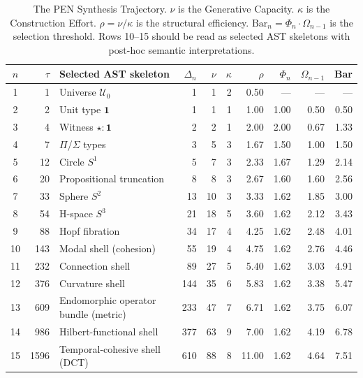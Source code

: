 \documentclass[11pt,a4paper]{article}
\theoremstyle{plain}
\theoremstyle{definition}
\theoremstyle{remark}
\newcommand{\U}{\mathcal{U}}
\begin{document}
\begin{table}[tbp]
\centering
\caption{The PEN Synthesis Trajectory.  $\nu$ is the Generative Capacity.  $\kappa$ is the Construction Effort.  $\rho = \nu/\kappa$ is the structural efficiency.  $\mathrm{Bar}_n = \Phi_n \cdot \Omega_{n-1}$ is the selection threshold.  Rows 10--15 should be read as selected AST skeletons with post-hoc semantic interpretations.}
\label{tab:genesis}
\small
\setlength{\tabcolsep}{3pt}
\begin{tabular}{@{}cr l rrrr rrr@{}}
\toprule
$n$ & $\tau$ & Selected AST skeleton & $\Delta_n$ & $\nu$ & $\kappa$ & $\rho$ & $\Phi_n$ & $\Omega_{n-1}$ & Bar \\
\midrule
1  & 1    & Universe $\U_0$              & 1   & 1   & 2 & 0.50  & ---  & ---  & ---  \\
2  & 2    & Unit type $\mathbf{1}$       & 1   & 1   & 1 & 1.00  & 1.00 & 0.50 & 0.50 \\
3  & 4    & Witness $\star : \mathbf{1}$ & 2   & 2   & 1 & 2.00  & 2.00 & 0.67 & 1.33 \\
4  & 7    & $\Pi$/$\Sigma$ types         & 3   & 5   & 3 & 1.67  & 1.50 & 1.00 & 1.50 \\
\midrule
5  & 12   & Circle $S^1$                 & 5   & 7   & 3 & 2.33  & 1.67 & 1.29 & 2.14 \\
6  & 20   & Propositional truncation     & 8   & 8   & 3 & 2.67  & 1.60 & 1.60 & 2.56 \\
7  & 33   & Sphere $S^2$                 & 13  & 10  & 3 & 3.33  & 1.62 & 1.85 & 3.00 \\
8  & 54   & H-space $S^3$                & 21  & 18  & 5 & 3.60  & 1.62 & 2.12 & 3.43 \\
9  & 88   & Hopf fibration               & 34  & 17  & 4 & 4.25  & 1.62 & 2.48 & 4.01 \\
\midrule
10 & 143  & Modal shell (cohesion)              & 55  & 19  & 4 & 4.75  & 1.62 & 2.76 & 4.46 \\
11 & 232  & Connection shell                    & 89  & 27  & 5 & 5.40  & 1.62 & 3.03 & 4.91 \\
12 & 376  & Curvature shell                     & 144 & 35  & 6 & 5.83  & 1.62 & 3.38 & 5.47 \\
13 & 609  & Endomorphic operator bundle (metric) & 233 & 47  & 7 & 6.71  & 1.62 & 3.75 & 6.07 \\
14 & 986  & Hilbert-functional shell            & 377 & 63  & 9 & 7.00  & 1.62 & 4.19 & 6.78 \\
\midrule
15 & 1596 & Temporal-cohesive shell (DCT) & 610 & 88  & 8 & 11.00 & 1.62 & 4.64 & 7.51 \\
\bottomrule
\end{tabular}
\end{table}
\end{document}
